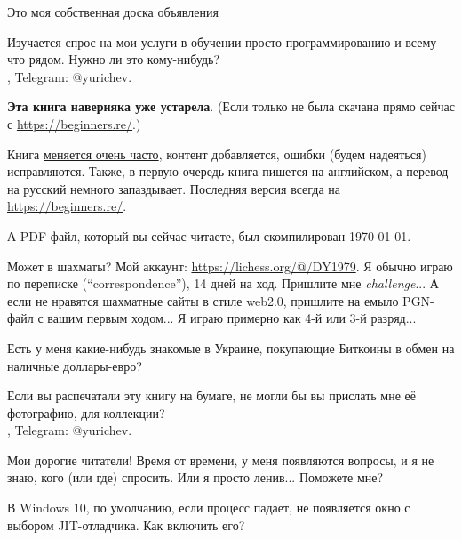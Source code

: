 
\begin{center}
\LARGE{} Это моя собственная доска объявления \normalsize{}
\end{center}

\myhrule{}

Изучается спрос на мои услуги в обучении просто программированию и всему что рядом.
Нужно ли это кому-нибудь? \\
\EMAIL{}, Telegram: @yurichev.

\myhrule{}

\textbf{Эта книга наверняка уже устарела}.
(Если только не была скачана прямо сейчас с \url{https://beginners.re/}.)

Книга \href{\RepoURL/ChangeLog}{меняется очень часто},
контент добавляется, ошибки (будем надеяться) исправляются.
Также, в первую очередь книга пишется на английском, а перевод на русский немного запаздывает.
Последняя версия всегда на \url{https://beginners.re/}.

А PDF-файл, который вы сейчас читаете, был скомпилирован \today{}.

\myhrule{}

Может в шахматы?
Мой аккаунт: \url{https://lichess.org/@/DY1979}.
Я обычно играю по переписке (``correspondence''), 14 дней на ход.
Пришлите мне \textit{challenge}...
А если не нравятся шахматные сайты в стиле web2.0, пришлите на емыло PGN-файл с вашим первым ходом...
Я играю примерно как 4-й или 3-й разряд...

\myhrule{}

Есть у меня какие-нибудь знакомые в Украине, покупающие Биткоины в обмен на наличные доллары-евро?

\myhrule{}

Если вы распечатали эту книгу на бумаге, не могли бы вы прислать мне её фотографию, для коллекции?\\
\EMAIL{}, Telegram: @yurichev.

\myhrule{}

Мои дорогие читатели! Время от времени, у меня появляются вопросы, и я не знаю, кого (или где) спросить.
Или я просто ленив...
Поможете мне?

\myhrule{}

В Windows 10, по умолчанию, если процесс падает, не появляется окно с выбором JIT-отладчика.
Как включить его?

\myhrule{}

